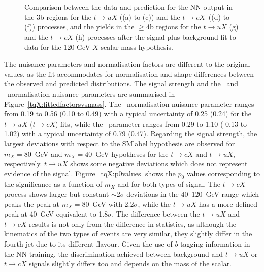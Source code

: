 \begin{figure}[htb]
    \RawFloats
    \centering
     \\
     \\ 
    \caption{Comparison between the data and prediction for the NN output in the 3b regions for the $t\to uX$ ((a) to (c))
    and the $t\to cX$\ ((d) to (f)) processes, 
    and the yields in the $\geq$4b regions for the $t\to uX$ (g) and the $t\to cX$ (h) processes 
    after the signal-plus-background fit to data for the 120 GeV $X$ scalar mass hypothesis.}
    \label{tqX:NNfit120}
\end{figure}


\clearpage

The nuisance parameters and normalisation factors are different to the original values, as the fit accommodates for normalisation and shape differences between the observed and predicted distributions. The signal strength and the \ttb\ and \ttc\ normalisation nuisance parameters are summarised in Figure~\ref{tqX:fittedfactorsvsmass}. The \ttb\ normalisation nuisance parameter ranges from 0.19 to 0.56 (0.10 to 0.49) with a typical uncertainty of 0.25 (0.24) for the $t\to uX$ ($t\to cX$) fits, while the \ttc\ parameter ranges from 0.29 to 1.10 (-0.13 to 1.02) with a typical uncertainty of 0.79 (0.47). Regarding the signal strength, the largest deviations with respect to the \acrshort{SMlabel} hypothesis are observed for $m_X=80$~GeV  and $m_X=40$~GeV hypotheses for the $t\to cX$ and $t\to uX$, respectively. $t\to uX$ shows some negative deviations which does not represent evidence of the signal. Figure~\ref{tqX:p0values} shows the $p_0$ values corresponding to the significance as a function of $m_X$ and for both types of signal. The $t\to cX$ process shows larger but constant $\sim2\sigma$ deviations in the 40--120~GeV range which peaks the peak at $m_X=80$~GeV with 2.2$\sigma$, while the $t\to uX$ has a more defined peak at 40~GeV equivalent to 1.8$\sigma$. The difference between the $t\to uX$ and $t\to cX$ results is not only from the difference in statistics, as although the kinematics of the two types of events are very similar, they slightly differ in the fourth jet due to its different flavour. Given the use of $b$-tagging information in the NN training, the discrimination achieved between background and $t\to uX$ or $t\to cX$ signals slightly differs too and depends on the mass of the scalar.

